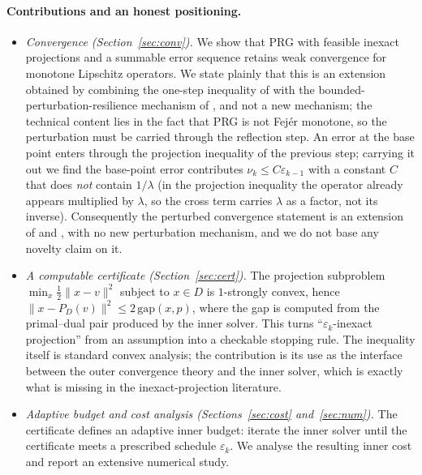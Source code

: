 \documentclass[11pt]{article}
\theoremstyle{plain}
\theoremstyle{definition}
\theoremstyle{remark}
\newcommand{\norm}[1]{\lVert #1 \rVert}
\newcommand{\proj}[1]{P_{#1}}
\begin{document}
\paragraph{Contributions and an honest positioning.}
\begin{itemize}
\item \emph{Convergence (Section~\ref{sec:conv}).} We show that PRG with
      feasible inexact projections and a summable error sequence retains weak
      convergence for monotone Lipschitz operators. We state plainly that this
      is an extension obtained by combining the one-step inequality of
      \cite{Malitsky2015} with the bounded-perturbation-resilience mechanism of
      \cite{Censor2017}, and not a new mechanism; the technical content lies in
      the fact that PRG is not Fej\'er monotone, so the perturbation must be
      carried through the reflection step. An error at the base point enters
      through the projection inequality of the previous step; carrying it out we
      find the base-point error contributes $\nu_k \le C\varepsilon_{k-1}$ with a
      constant $C$ that does \emph{not} contain $1/\lambda$ (in the projection
      inequality the operator already appears multiplied by $\lambda$, so the
      cross term carries $\lambda$ as a factor, not its inverse). Consequently
      the perturbed convergence statement is an extension of \cite{Malitsky2015}
      and \cite{Censor2017}, with no new perturbation mechanism, and we do not
      base any novelty claim on it.
\item \emph{A computable certificate (Section~\ref{sec:cert}).} The projection
      subproblem $\min_x \tfrac12 \norm{x-v}^2$ subject to $x \in D$ is
      $1$-strongly convex, hence
      $\norm{x - \proj{D}(v)}^2 \le 2\,\mathrm{gap}(x,p)$, where the gap is
      computed from the primal--dual pair produced by the inner solver. This
      turns ``$\varepsilon_k$-inexact projection'' from an assumption into a
      checkable stopping rule. The inequality itself is standard convex
      analysis; the contribution is its use as the interface between the outer
      convergence theory and the inner solver, which is exactly what is missing
      in the inexact-projection literature.
\item \emph{Adaptive budget and cost analysis (Sections~\ref{sec:cost}
      and~\ref{sec:num}).} The certificate defines an adaptive inner budget:
      iterate the inner solver until the certificate meets a prescribed
      schedule $\varepsilon_k$. We analyse the resulting inner cost and report
      an extensive numerical study.
\end{itemize}
\end{document}
